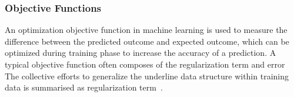\subsubsection{Objective Functions}
An optimization objective function in machine learning is used to measure the difference between the predicted outcome and expected outcome, which can be optimized during training phase to increase the accuracy of a prediction. A typical objective function often composes of the regularization term and error The collective efforts to generalize the underline data structure within training data is summarised as regularization term~\cite{goodfellow_2015}.  
